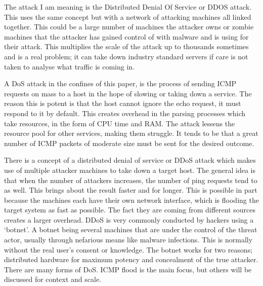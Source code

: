 The attack I am meaning is the Distributed Denial Of Service or DDOS attack. This uses the same concept but with a network of attacking machines all linked together. This could be a large number of machines the attacker owns or zombie machines that the attacker has gained control of with malware and is using for their attack. This multiplies the scale of the attack up to thousands sometimes and is a real problem; it can take down industry 
standard servers if care is not taken to analyse what traffic is coming in.

A DoS attack in the confines of this paper, is the process of sending ICMP requests on mass to a host in the hope of slowing or taking down a service. The reason this is potent is that the host cannot ignore the echo request, it must respond to it by default. This creates overhead in the parsing processes which take resources, in the form of CPU time and RAM. The attack lessens the resource pool for other services, making them struggle. 
It tends to be that a great number of ICMP packets of moderate size must be sent for the desired outcome.

There is a concept of a distributed denial of service or DDoS attack which makes use of multiple attacker machines to take down a target host. The general idea is that when the number of attackers increases, the number of ping requests tend to as well. This brings about the result faster and for longer. This is possible in part because the machines each have their own network interface, which is flooding the target system as fast as possible. 
The fact they are coming from different sources creates a larger overhead. DDoS is very commonly conducted by hackers using a ‘botnet’. A botnet being several machines that are under the control of the threat actor, usually through nefarious means like malware infections. This is normally without the real user’s consent or knowledge. The botnet works for two reasons; distributed hardware for maximum potency and concealment of the true attacker. 
There are many forms of DoS. ICMP flood is the main focus, but others will be discussed for context and scale. 

